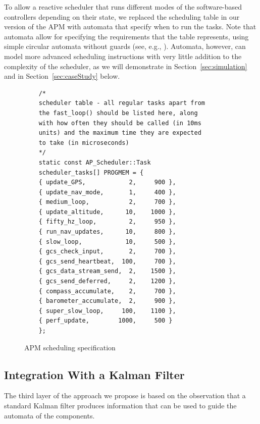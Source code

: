 \documentclass[ twoside, 12pt ]{article}
\begin{document}
To allow a reactive scheduler that runs different modes of the software-based controllers depending on their state, we replaced the scheduling table in our version of the APM with automata that specify when to run the tasks. Note that automata allow for specifying the requirements that the table represents, using simple circular automata without guards (see, e.g., \cite{weiss2007automata}). Automata, however, can model more advanced scheduling instructions with very little addition to the complexity of the scheduler, as we will demonstrate in Section~\ref{sec:simulation} and in Section~\ref{sec:caseStudy} below.

\begin{figure}[]
    \scriptsize
    \begin{lstlisting}
    /*
    scheduler table - all regular tasks apart from
    the fast_loop() should be listed here, along 
    with how often they should be called (in 10ms 
    units) and the maximum time they are expected 
    to take (in microseconds)
    */
    static const AP_Scheduler::Task 
    scheduler_tasks[] PROGMEM = {
    { update_GPS,            2,     900 },
    { update_nav_mode,       1,     400 },
    { medium_loop,           2,     700 },
    { update_altitude,      10,    1000 },
    { fifty_hz_loop,         2,     950 },
    { run_nav_updates,      10,     800 },
    { slow_loop,            10,     500 },
    { gcs_check_input,       2,     700 },
    { gcs_send_heartbeat,  100,     700 },
    { gcs_data_stream_send,  2,    1500 },
    { gcs_send_deferred,     2,    1200 },
    { compass_accumulate,    2,     700 },
    { barometer_accumulate,  2,     900 },
    { super_slow_loop,     100,    1100 },
    { perf_update,        1000,     500 }
    };
    \end{lstlisting}
    \caption{APM scheduling specification}
    \label{fig:apm-scheduler} 
\end{figure}

\subsection{Integration With a Kalman Filter}
\label{sec:Arch-kalman}
The third layer of the approach we propose is based on the observation that a standard Kalman filter produces information that can be used to guide the automata of the components. 
\end{document}
